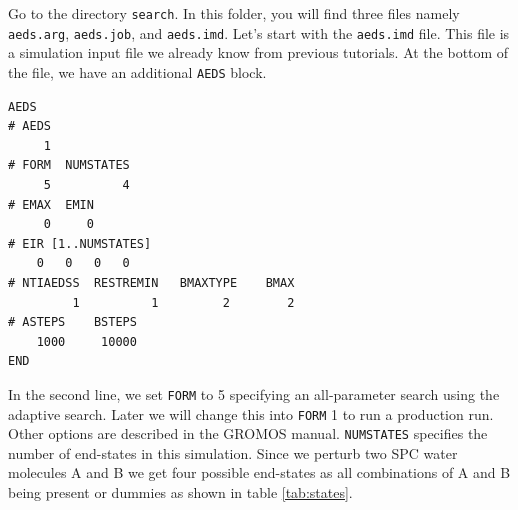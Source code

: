 Go to the directory \texttt{search}. In this folder, you will find three files namely \texttt{aeds.arg}, \texttt{aeds.job}, and \texttt{aeds.imd}. Let's start with the \texttt{aeds.imd} file. This file is a simulation input file we already know from previous tutorials. At the bottom of the file, we have an additional \texttt{AEDS} block.

\begin{lstlisting}
AEDS
# AEDS
     1
# FORM  NUMSTATES
     5          4
# EMAX  EMIN
     0     0
# EIR [1..NUMSTATES]
    0   0   0   0 
# NTIAEDSS  RESTREMIN   BMAXTYPE    BMAX 
         1          1         2        2    
# ASTEPS    BSTEPS
    1000     10000 
END
\end{lstlisting}
In the second line, we set \texttt{FORM} to 5 specifying an all-parameter search using the adaptive search.
Later we will change this into \texttt{FORM} 1 to run a production run. Other options are described in the GROMOS manual. \texttt{NUMSTATES} specifies the number of end-states in this simulation. Since we perturb two SPC water molecules A and B we get four possible end-states as all combinations of A and B being present or dummies as shown in table \ref{tab:states}.

